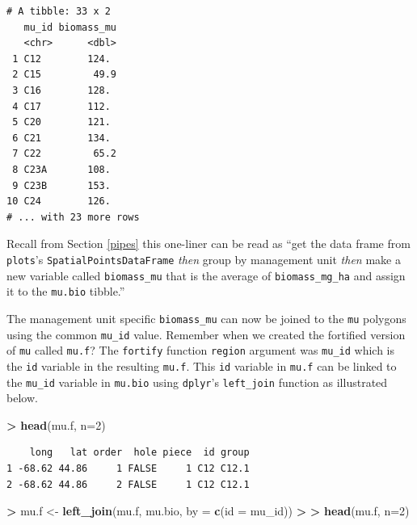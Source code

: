\documentclass[
]{krantz}
\makeatletter
\newenvironment{Shaded}{\begin{snugshade}}{\end{snugshade}}
\newcommand{\DataTypeTok}[1]{\textcolor[rgb]{0.27,0.27,0.27}{#1}}
\newcommand{\DecValTok}[1]{\textcolor[rgb]{0.06,0.06,0.06}{#1}}
\newcommand{\ErrorTok}[1]{\textcolor[rgb]{0.14,0.14,0.14}{\textbf{#1}}}
\newcommand{\KeywordTok}[1]{\textcolor[rgb]{0.27,0.27,0.27}{\textbf{#1}}}
\newcommand{\NormalTok}[1]{#1}
\newcommand{\OperatorTok}[1]{\textcolor[rgb]{0.43,0.43,0.43}{\textbf{#1}}}
\newcommand{\StringTok}[1]{\textcolor[rgb]{0.5,0.5,0.5}{#1}}
\newenvironment{kframe}{%
\medskip{}
\setlength{\fboxsep}{.8em}
 \def\at@end@of@kframe{}%
 \ifinner\ifhmode%
  \def\at@end@of@kframe{\end{minipage}}%
  \begin{minipage}{\columnwidth}%
 \fi\fi%
 \def\FrameCommand##1{\hskip\@totalleftmargin \hskip-\fboxsep
 \colorbox{shadecolor}{##1}\hskip-\fboxsep
     \hskip-\linewidth \hskip-\@totalleftmargin \hskip\columnwidth}%
 \MakeFramed {\advance\hsize-\width
   \@totalleftmargin\z@ \linewidth\hsize
   \@setminipage}}%
 {\par\unskip\endMakeFramed%
 \at@end@of@kframe}
\renewenvironment{Shaded}{\begin{kframe}}{\end{kframe}}
\makeatother
\begin{document}
\begin{verbatim}
# A tibble: 33 x 2
   mu_id biomass_mu
   <chr>      <dbl>
 1 C12        124. 
 2 C15         49.9
 3 C16        128. 
 4 C17        112. 
 5 C20        121. 
 6 C21        134. 
 7 C22         65.2
 8 C23A       108. 
 9 C23B       153. 
10 C24        126. 
# ... with 23 more rows
\end{verbatim}

Recall from Section \ref{pipes} this one-liner can be read as ``get the data frame from \texttt{plots}'s \texttt{SpatialPointsDataFrame} \emph{then} group by management unit \emph{then} make a new variable called \texttt{biomass\_mu} that is the average of \texttt{biomass\_mg\_ha} and assign it to the \texttt{mu.bio} tibble.''

The management unit specific \texttt{biomass\_mu} can now be joined to the \texttt{mu} polygons using the common \texttt{mu\_id} value. Remember when we created the fortified version of \texttt{mu} called \texttt{mu.f}? The \texttt{fortify} function \texttt{region} argument was \texttt{mu\_id} which is the \texttt{id} variable in the resulting \texttt{mu.f}. This \texttt{id} variable in \texttt{mu.f} can be linked to the \texttt{mu\_id} variable in \texttt{mu.bio} using \texttt{dplyr}'s \texttt{left\_join} function as illustrated below.

\begin{Shaded}
\begin{Highlighting}[]
\OperatorTok{\textgreater{}}\StringTok{ }\KeywordTok{head}\NormalTok{(mu.f, }\DataTypeTok{n=}\DecValTok{2}\NormalTok{)}
\end{Highlighting}
\end{Shaded}

\begin{verbatim}
    long   lat order  hole piece  id group
1 -68.62 44.86     1 FALSE     1 C12 C12.1
2 -68.62 44.86     2 FALSE     1 C12 C12.1
\end{verbatim}

\begin{Shaded}
\begin{Highlighting}[]
\OperatorTok{\textgreater{}}\StringTok{ }\NormalTok{mu.f \textless{}{-}}\StringTok{ }\KeywordTok{left\_join}\NormalTok{(mu.f, mu.bio, }\DataTypeTok{by =} \KeywordTok{c}\NormalTok{(}\StringTok{\textquotesingle{}id\textquotesingle{}}\NormalTok{ =}\StringTok{ \textquotesingle{}mu\_id\textquotesingle{}}\NormalTok{))}
\OperatorTok{\textgreater{}}\StringTok{ }
\ErrorTok{\textgreater{}}\StringTok{ }\KeywordTok{head}\NormalTok{(mu.f, }\DataTypeTok{n=}\DecValTok{2}\NormalTok{)}
\end{Highlighting}
\end{Shaded}
\end{document}
